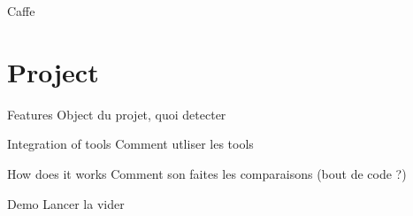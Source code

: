 \documentclass{beamer}
\begin{document}
\begin{frame}{Caffe}
    \begin{itemize}
        \item CAFFE: Convolutional Architecture for Fast Feature Embedding  \\
            \hspace{0.27cm}\textit}
    \end{itemize}
\end{frame}

\section{Project}
\begin{frame}{Features}
    Object du projet, quoi detecter
\end{frame}
\begin{frame}{Integration of tools}
    Comment utliser les tools
\end{frame}
\begin{frame}{How does it works}
    Comment son faites les comparaisons (bout de code ?)
\end{frame}
\begin{frame}{Demo}
    Lancer la vider
\end{frame}
\end{document}
